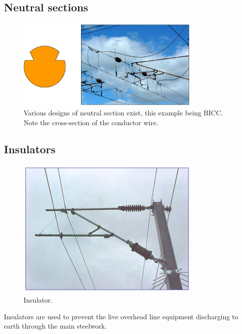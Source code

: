 \subsection{Neutral sections}
\begin{figure}[H]
    \centering
    \includegraphics[width = 0.8\textwidth]{img/figure137.png}
    \caption{Various designs of neutral section exist, this example being BICC. Note the cross-section of the conductor wire.}
\end{figure}
\subsection{Insulators}
\begin{figure}[H]
    \centering
    \includegraphics[width = 0.8\textwidth]{img/figure138.png}
    \caption{Insulator.}
\end{figure}
Insulators are used to prevent the live overhead line equipment discharging to earth through the main steelwork. 
